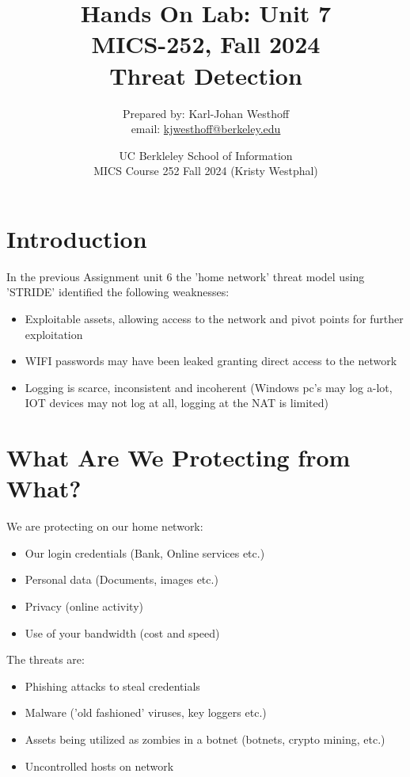 \documentclass[
	letterpaper, %
	10pt, %
	unnumberedsections, %
	twoside, %
]{APAAssignment}
\title{Hands On Lab: Unit 7 \\ MICS-252, Fall 2024 \\ Threat Detection} %
\date{UC Berkleley School of Information \\
MICS Course 252 Fall 2024 (Kristy Westphal)
}
\author{
	Prepared by: Karl-Johan Westhoff \\
	email: \href{mailto:kjwesthoff@berkeley.edu}{kjwesthoff@berkeley.edu}
}
\begin{document}
\onecolumn
\maketitle %



\section{Introduction}
In the previous Assignment unit 6 \cite{Assingnment6} the 'home network' threat model using 'STRIDE' identified the following weaknesses:

\begin{spacing}{1}
	\begin{itemize}
		\item Exploitable assets, allowing access to the network and pivot points for further exploitation
		\item WIFI passwords may have been leaked granting direct access to the network
		\item Logging is scarce, inconsistent and incoherent (Windows pc's may log a-lot, IOT devices may not log at all, logging at the NAT is limited)
	\end{itemize}
\end{spacing}

\section{What Are We Protecting from What?}
We are protecting on our home network:
\begin{spacing}{1}
	\begin{itemize}
		\item Our login credentials (Bank, Online services etc.)
		\item Personal data (Documents, images etc.)
		\item Privacy (online activity)
		\item Use of your bandwidth (cost and speed)
	\end{itemize}
\end{spacing}

The threats are:

\begin{spacing}{1}
	\begin{itemize}
		\item Phishing attacks to steal credentials
		\item Malware ('old fashioned' viruses, key loggers etc.)
		\item Assets being utilized as zombies in a botnet (botnets, crypto mining, etc.)
		\item Uncontrolled hosts on network
	\end{itemize}
\end{spacing}
\end{document}
